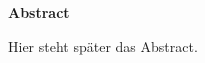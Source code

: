 \thispagestyle{plain}


\begin{huge}
	\textbf{Abstract}\\
\end{huge}

Hier steht später das Abstract.

\clearpage